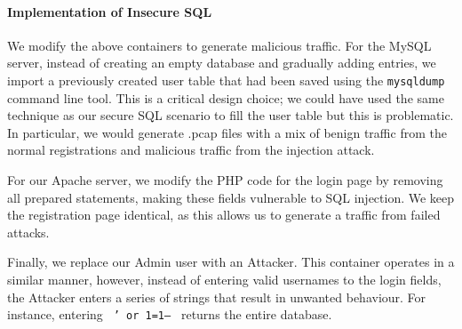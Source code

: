 \documentclass[msc,deptreport, cs]{infthesis} %
\begin{document}
\paragraph*{Implementation of Insecure SQL}

We modify the above containers to generate malicious traffic. For the MySQL server, instead of creating an empty database and gradually adding entries, we import a previously created user table that had been saved using the \texttt{mysqldump} command line tool. This is a critical design choice; we could have used the same technique as our secure SQL scenario to fill the user table but this is problematic. In particular, we would generate .pcap files with a mix of benign traffic from the normal registrations and malicious traffic from the injection attack.

For our Apache server, we modify the PHP code for the login page by removing all prepared statements, making these fields vulnerable to SQL injection. We keep the registration page identical, as this allows us to generate a traffic from failed attacks.

Finally, we replace our Admin user with an Attacker. This container operates in a similar manner, however, instead of entering valid usernames to the login fields, the Attacker enters a series of strings that result in unwanted behaviour. For instance, entering \texttt{ ' or 1=1-- } returns the entire database.
\end{document}
